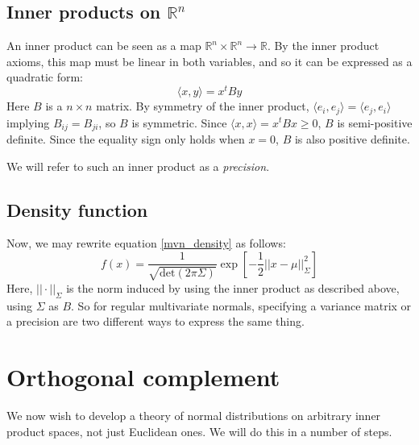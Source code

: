 \documentclass[12pt, a4paper]{article}
\numberwithin{equation}{section}
\begin{document}
\subsection{Inner products on $\mathbb{R}^n$}
An inner product can be seen as a map $\mathbb{R}^n\times\mathbb{R}^n\rightarrow\mathbb{R}$. By the inner product axioms, this map must be linear in both variables, and so it can be expressed as a quadratic form:
\begin{equation}
\langle x,y\rangle=x^t By
\end{equation}
Here $B$ is a $n\times n$ matrix. By symmetry of the inner product, $\langle e_i,e_j\rangle=\langle e_j,e_i\rangle$ implying $B_{ij}=B_{ji}$, so $B$ is symmetric. Since $\langle x,x\rangle=x^t Bx\ge 0$, $B$ is semi-positive definite. Since the equality sign only holds when $x=0$, $B$ is also positive definite.

We will refer to such an inner product as a \textit{precision}.

\subsection{Density function}
Now, we may rewrite equation \ref{mvn_density} as follows:
\begin{equation}
f(x)=\frac{1}{\sqrt{\textrm{det}(2\pi\Sigma)}}\exp\left[-\frac{1}{2}||x-\mu||_\Sigma^2\right]
\end{equation}
Here, $||\cdot||_\Sigma$ is the norm induced by using the inner product as described above, using $\Sigma$ as $B$. So for regular multivariate normals, specifying a variance matrix or a precision are two different ways to express the same thing.

\section{Orthogonal complement}
We now wish to develop a theory of normal distributions on arbitrary inner product spaces, not just Euclidean ones. We will do this in a number of steps.
\end{document}
